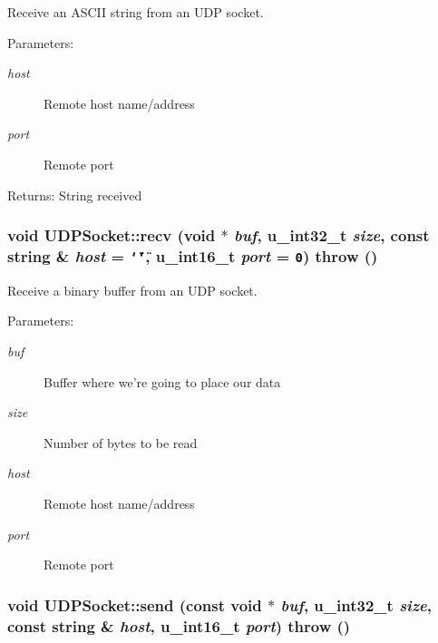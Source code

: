 Receive an ASCII string from an UDP socket. 

\begin{Desc}
\item[Parameters:]
\begin{description}
\item[{\em host}]Remote host name/address \item[{\em port}]Remote port \end{description}
\end{Desc}
\begin{Desc}
\item[Returns:]String received \end{Desc}
\hypertarget{classUDPSocket_0ac43ab32b13c76ea9c639f6fc2314f3}{
\subsubsection[{recv}]{\setlength{\rightskip}{0pt plus 5cm}void UDPSocket::recv (void $\ast$ {\em buf}, \/  u\_\-int32\_\-t {\em size}, \/  const string \& {\em host} = {\tt \char`\"{}\char`\"{}}, \/  u\_\-int16\_\-t {\em port} = {\tt 0})  throw ()}}
\label{classUDPSocket_0ac43ab32b13c76ea9c639f6fc2314f3}


Receive a binary buffer from an UDP socket. 

\begin{Desc}
\item[Parameters:]
\begin{description}
\item[{\em buf}]Buffer where we're going to place our data \item[{\em size}]Number of bytes to be read \item[{\em host}]Remote host name/address \item[{\em port}]Remote port \end{description}
\end{Desc}
\hypertarget{classUDPSocket_5bbc712a57056d84e0682541fe2f19cd}{
\subsubsection[{send}]{\setlength{\rightskip}{0pt plus 5cm}void UDPSocket::send (const void $\ast$ {\em buf}, \/  u\_\-int32\_\-t {\em size}, \/  const string \& {\em host}, \/  u\_\-int16\_\-t {\em port})  throw ()}}
\label{classUDPSocket_5bbc712a57056d84e0682541fe2f19cd}


